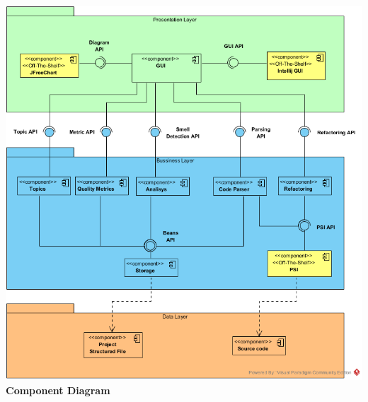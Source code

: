 \includegraphics[scale=0.85]{PS_Architecture/diagrams_PNG/Component_Diagram.png}\\
\centering
\textbf{Component Diagram}\\

\flushleft


